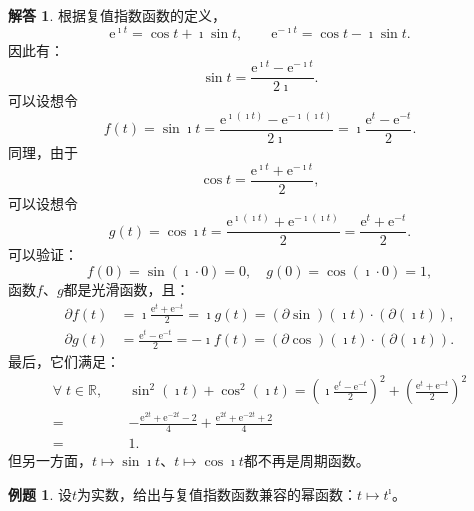 \documentclass[12pt,UTF8]{ctexbook}
\newcommand{\e}{\mathrm{e}}
\theoremstyle{definition}
\newtheorem{et}{例题}[section]
\newtheorem*{so}{解答}
\theoremstyle{plain}
\begin{document}
\begin{so}
    根据复值指数函数的定义，
    $$ \e^{\imath t} = \cos{t} + \imath \sin{t}, \qquad \e^{-\imath t} = \cos{t} - \imath \sin{t}. $$
    因此有：
    $$ \sin{t} = \frac{\e^{\imath t} - \e^{-\imath t}}{2\imath}.$$
    可以设想令
    $$ f(t) = \sin{\imath t} = \frac{\e^{\imath (\imath t)} - \e^{-\imath (\imath t)}}{2\imath} = \imath \frac{\e^{t} - \e^{-t}}{2}.$$
    同理，由于
    $$ \cos{t} = \frac{\e^{\imath t} + \e^{-\imath t}}{2},$$
    可以设想令
    $$ g(t) = \cos{\imath t} = \frac{\e^{\imath (\imath t)} + \e^{-\imath (\imath t)}}{2} = \frac{\e^{t} + \e^{-t}}{2}.$$
    可以验证：
    $$ f(0) = \sin{(\imath \cdot 0)} = 0, \quad g(0)=\cos{(\imath \cdot 0)} = 1,$$
    函数$f$、$g$都是光滑函数，且：
    \begin{align*}
        \partial f(t) &= \imath \frac{\e^{t} + \e^{-t}}{2} = \imath g(t) = (\partial\sin)(\imath t)\cdot (\partial(\imath t)), \\
        \partial g(t) &= \frac{\e^{t} - \e^{-t}}{2} = -\imath f(t) = (\partial\cos)(\imath t)\cdot (\partial(\imath t)).
    \end{align*}
    最后，它们满足：
    \begin{align*}
        \forall \; t\in \mathbb{R}, \quad & \sin^2{(\imath t)} + \cos^2{(\imath t)} = \left(\imath \frac{\e^{t} - \e^{-t}}{2}\right)^2 + \left( \frac{\e^{t} + \e^{-t}}{2}\right)^2 \\
        =\;& -\frac{\e^{2t} + \e^{-2t} - 2}{4} + \frac{\e^{2t} + \e^{-2t} + 2}{4} \\
        =\;& 1.
    \end{align*}
    但另一方面，$t\mapsto \sin{\imath t}$、$t\mapsto \cos{\imath t}$都不再是周期函数。

\end{so}

\begin{et}
    设$t$为实数，给出与复值指数函数兼容的幂函数：$t\mapsto t^{\imath}$。
\end{et}
\end{document}
